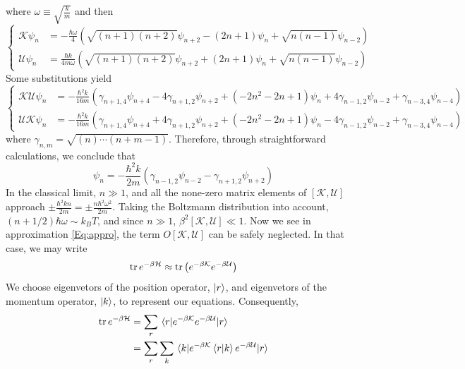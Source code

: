 \documentclass[letterpaper,12pt]{article}
\numberwithin{equation}{section}
\begin{document}
where $\omega\equiv\sqrt{\frac{k}{m}}$ and then 
\begin{equation}
    \left\{
        \begin{aligned}
            \mathcal{K}\psi_n&=-\frac{\hbar\omega}{4}\left(\sqrt{(n+1)(n+2)}\psi_{n+2}-(2n+1)\psi_n+\sqrt{n(n-1)}\psi_{n-2}\right) \\
            \mathcal{U}\psi_n&=\frac{\hbar k}{4m\omega}\left(\sqrt{(n+1)(n+2)}\psi_{n+2}+(2n+1)\psi_n+\sqrt{n(n-1)}\psi_{n-2}\right)
        \end{aligned}
    \right.
\end{equation}
Some substitutions yield
\[
    \left\{
        \begin{aligned}
            \mathcal{K}\mathcal{U}\psi_n&=-\frac{\hbar^2 k}{16m}\left(\gamma_{n+1,4}\psi_{n+4}-4\gamma_{n+1,2}\psi_{n+2}+(-2n^2-2n+1)\psi_n+4\gamma_{n-1,2}\psi_{n-2}+\gamma_{n-3,4}\psi_{n-4}\right) \\
            \mathcal{U}\mathcal{K}\psi_n&=-\frac{\hbar^2 k}{16m}\left(\gamma_{n+1,4}\psi_{n+4}+4\gamma_{n+1,2}\psi_{n+2}+(-2n^2-2n+1)\psi_n-4\gamma_{n-1,2}\psi_{n-2}+\gamma_{n-3,4}\psi_{n-4}\right)
        \end{aligned}
    \right.
\]
where $\gamma_{n,m}=\sqrt{(n)\cdots(n+m-1)}$. Therefore, through straightforward calculations, we conclude that 
\begin{equation}
    [\mathcal{K},\mathcal{U}]\psi_n=-\frac{\hbar^2 k}{2m}\left(\gamma_{n-1,2}\psi_{n-2}-\gamma_{n+1,2}\psi_{n+2}\right)
\end{equation}
In the classical limit, $n\gg 1$, and all the none-zero matrix elements of $[\mathcal{K},\mathcal{U}]$ approach $\pm \frac{\hbar^2 kn}{2m}=\pm \frac{n\hbar^2\omega^2}{2m}$. Taking the Boltzmann distribution into account, $(n+1/2)\hbar\omega\sim k_BT$, and since $n\gg 1$, $\beta^2[\mathcal{K},\mathcal{U}]\ll 1$. Now we see in approximation \ref{Eq:appro}, the term $O[\mathcal{K},\mathcal{U}]$ can be safely neglected.  In that case, we may write
\begin{equation}
    \tr e^{-\beta\mathcal{H}}\approx\tr \left(e^{-\beta\mathcal{K}}e^{-\beta\mathcal{U}}\right)
\end{equation}
We choose eigenvetors of the position operator, $\ket{r}$, and eigenvetors of the momentum operator, $\ket{k}$, to represent our equations. Consequently, 
\[
    \begin{aligned}
        \tr e^{-\beta\mathcal{H}}&=\sum\limits_{r}{\matrixelement{r}{e^{-\beta\mathcal{K}}e^{-\beta\mathcal{U}}}{r}} \\
        &=\sum\limits_r\sum\limits_k\matrixelement{k}{e^{-\beta\mathcal{K}}\braket{r}{k}e^{-\beta\mathcal{U}}}{r}
    \end{aligned}
\]
\end{document}
